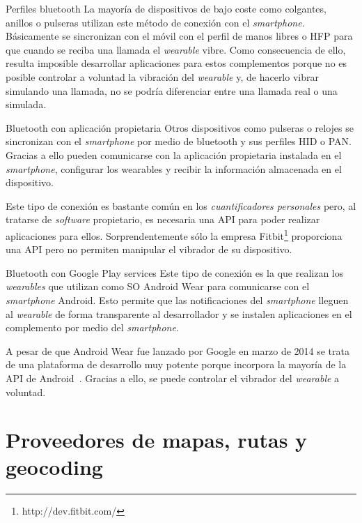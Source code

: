 \begin{definitionlist}
  \item[Perfiles bluetooth] La mayoría de dispositivos de bajo coste como colgantes, anillos o
    pulseras utilizan este método de conexión con el \emph{smartphone}. Básicamente se sincronizan
    con el móvil con el perfil de manos libres o \acf{HFP} para que cuando se reciba una
    llamada el \emph{wearable} vibre. Como consecuencia de ello, resulta imposible desarrollar
    aplicaciones para estos complementos porque no es posible controlar a voluntad la vibración del
    \emph{wearable} y, de hacerlo vibrar simulando una llamada, no se podría diferenciar entre una
    llamada real o una simulada.

  \item[Bluetooth con aplicación propietaria] Otros dispositivos como pulseras o relojes se
    sincronizan con el \emph{smartphone} por medio de bluetooth y sus perfiles \acf{HID} o
    \acf{PAN}. Gracias a ello pueden comunicarse con la aplicación propietaria instalada en el
    \emph{smartphone}, configurar los wearables y recibir la información almacenada en el
    dispositivo.

    Este tipo de conexión es bastante común en los \emph{cuantificadores personales} pero, al
    tratarse de \emph{software} propietario, es necesaria una \acs{API} para poder realizar
    aplicaciones para ellos. Sorprendentemente sólo la empresa
    Fitbit\footnote{http://dev.fitbit.com/} proporciona una \acs{API} pero no permiten manipular el
    vibrador de su dispositivo.

  \item[Bluetooth con Google Play services] Este tipo de conexión es la que realizan los
    \emph{wearables} que utilizan como \acs{SO} Android Wear para comunicarse con el
    \emph{smartphone} Android. Esto permite que las notificaciones del \emph{smartphone} lleguen al
    \emph{wearable} de forma transparente al desarrollador y se instalen aplicaciones en el
    complemento por medio del \emph{smartphone}.

    A pesar de que Android Wear fue lanzado por Google en marzo de 2014 se trata de una plataforma
    de desarrollo muy potente porque incorpora la mayoría de la \acs{API} de
    Android~\cite{APIAW}. Gracias a ello, se puede controlar el vibrador del \emph{wearable} a
    voluntad.
 
\end{definitionlist}

\section{Proveedores de mapas, rutas y geocoding}
\label{sec:proveedores}


